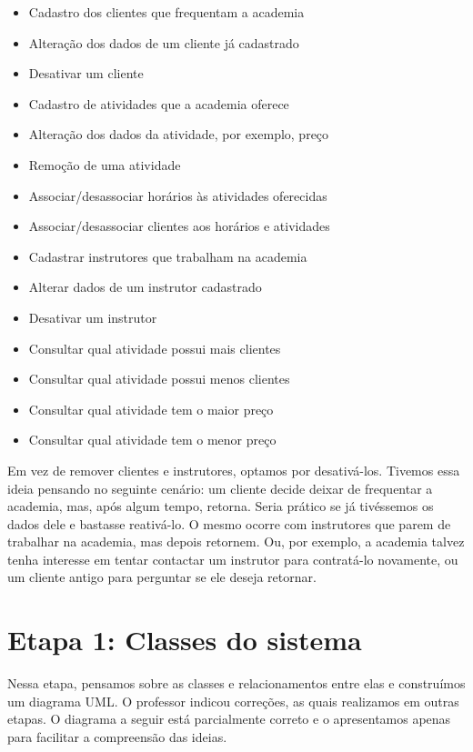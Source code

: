 \documentclass[11pt,twoside]{article}
\begin{document}
\begin{itemize}
  \item Cadastro dos clientes que frequentam a academia
  \item Alteração dos dados de um cliente já cadastrado
  \item Desativar um cliente
  \item Cadastro de atividades que a academia oferece
  \item Alteração dos dados da atividade, por exemplo, preço
  \item Remoção de uma atividade
  \item Associar/desassociar horários às atividades oferecidas
  \item Associar/desassociar clientes aos horários e atividades
  \item Cadastrar instrutores que trabalham na academia
  \item Alterar dados de um instrutor cadastrado
  \item Desativar um instrutor
  \item Consultar qual atividade possui mais clientes
  \item Consultar qual atividade possui menos clientes
  \item Consultar qual atividade tem o maior preço
  \item Consultar qual atividade tem o menor preço
\end{itemize}

Em vez de remover clientes e instrutores, optamos por desativá-los. Tivemos essa ideia pensando no seguinte cenário: um cliente
decide deixar de frequentar a academia, mas, após algum tempo, retorna. Seria prático se já tivéssemos os dados dele e bastasse
reativá-lo. O mesmo ocorre com instrutores que parem de trabalhar na academia, mas depois retornem. Ou, por exemplo, a academia
talvez tenha interesse em tentar contactar um instrutor para contratá-lo novamente, ou um cliente antigo para perguntar se ele
deseja retornar.

\section{Etapa 1: Classes do sistema}
Nessa etapa, pensamos sobre as classes e relacionamentos entre elas e construímos um diagrama UML. O professor indicou correções,
as quais realizamos em outras etapas. O diagrama a seguir está parcialmente correto e o apresentamos apenas para facilitar a
compreensão das ideias.
\end{document}
